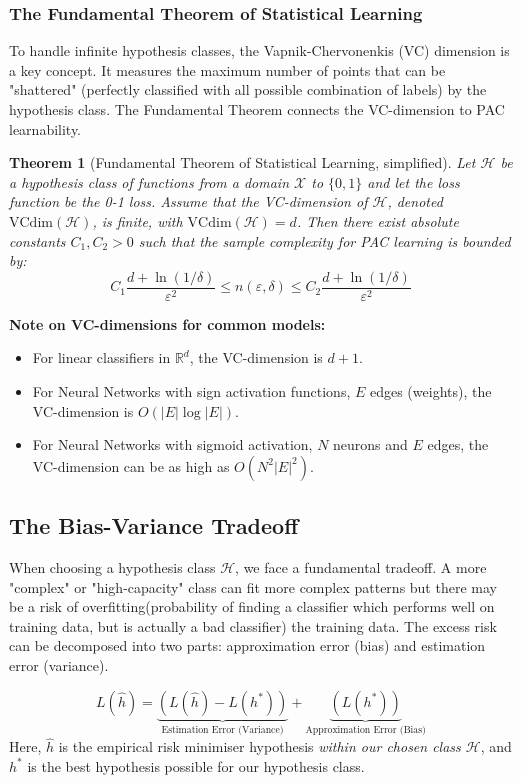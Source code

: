 \documentclass[11pt]{article}
\theoremstyle{plain} %
\newtheorem{theorem}{Theorem}[section] %
\begin{document}
\subsubsection{The Fundamental Theorem of Statistical Learning}
To handle infinite hypothesis classes, the Vapnik-Chervonenkis (VC) dimension is a key concept. It measures the maximum number of points that can be "shattered" (perfectly classified with all possible combination of labels) by the hypothesis class. The Fundamental Theorem connects the VC-dimension to PAC learnability.

\begin{theorem}[Fundamental Theorem of Statistical Learning, simplified]
Let $\mathcal{H}$ be a hypothesis class of functions from a domain $\mathcal{X}$ to $\{0,1\}$ and let the loss function be the 0-1 loss. Assume that the VC-dimension of $\mathcal{H}$, denoted $\mathrm{VCdim}(\mathcal{H})$, is finite, with $\mathrm{VCdim}(\mathcal{H}) = d$. Then there exist absolute constants $C_1, C_2 > 0$ such that the sample complexity for PAC learning is bounded by:
\[ C_1 \frac{d + \ln(1/\delta)}{\varepsilon^2} \leq n(\varepsilon, \delta) \leq C_2 \frac{d + \ln(1/\delta)}{\varepsilon^2} \]
\end{theorem}
\textbf{Note on VC-dimensions for common models:}
\begin{itemize}
    \item For linear classifiers in $\mathbb{R}^d$, the VC-dimension is $d+1$.
    \item For Neural Networks with sign activation functions, $E$ edges (weights), the VC-dimension is $O(|E| \log |E|)$.
    \item For Neural Networks with sigmoid activation, $N$ neurons and $E$ edges, the VC-dimension can be as high as $O(N^2 |E|^2)$.
\end{itemize}

\subsection{The Bias-Variance Tradeoff}
When choosing a hypothesis class $\mathcal{H}$, we face a fundamental tradeoff. A more "complex" or "high-capacity" class can fit more complex patterns but there may be a risk of overfitting(probability of finding a classifier which performs well on training data, but is actually a bad classifier) the training data. The excess risk can be decomposed into two parts: approximation error (bias) and estimation error (variance).

\[ L(\hat{h}) = \underbrace{\left(L(\hat{h}) - L(h^*)\right)}_{\text{Estimation Error (Variance)}} + \underbrace{\left( L(h^*)\right)}_{\text{Approximation Error (Bias)}} \]
Here, $\hat{h}$ is the empirical risk minimiser hypothesis \textit{within our chosen class $\mathcal{H}$}, and $h^*$ is the best hypothesis possible for our hypothesis class.
\end{document}
